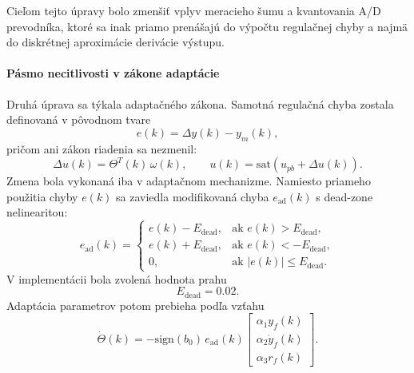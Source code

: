 Cieľom tejto úpravy bolo zmenšiť vplyv meracieho šumu a kvantovania A/D prevodníka,
ktoré sa inak priamo prenášajú do výpočtu regulačnej chyby a najmä do diskrétnej
aproximácie derivácie výstupu.

\paragraph{Pásmo necitlivosti v zákone adaptácie}

Druhá úprava sa týkala adaptačného zákona.
Samotná regulačná chyba zostala definovaná v pôvodnom tvare
\begin{equation}
    e(k) = \Delta y(k) - y_m(k),
    \label{eq:mrac_cpp_e_original}
\end{equation}
pričom ani zákon riadenia sa nezmenil:
\begin{equation}
    \Delta u(k) = \Theta^T(k)\,\omega(k),
    \qquad
    u(k) = \mathrm{sat}\!\left(u_{pb} + \Delta u(k)\right).
    \label{eq:mrac_cpp_control_unchanged}
\end{equation}
Zmena bola vykonaná iba v adaptačnom mechanizme.
Namiesto priameho použitia chyby $e(k)$ sa zaviedla modifikovaná chyba
$e_{\mathrm{ad}}(k)$ s dead-zone nelinearitou:
\begin{equation}
    e_{\mathrm{ad}}(k)=
    \begin{cases}
        e(k)-E_{\mathrm{dead}}, & \text{ak } e(k) > E_{\mathrm{dead}}, \\
        e(k)+E_{\mathrm{dead}}, & \text{ak } e(k) < -E_{\mathrm{dead}}, \\
        0, & \text{ak } |e(k)| \leq E_{\mathrm{dead}}.
    \end{cases}
    \label{eq:mrac_cpp_deadzone}
\end{equation}
V implementácii bola zvolená hodnota prahu
\begin{equation}
    E_{\mathrm{dead}} = 0.02.
    \label{eq:mrac_cpp_edead}
\end{equation}
Adaptácia parametrov potom prebieha podľa vzťahu
\begin{equation}
    \dot{\Theta}(k) =
    -\mathrm{sign}(b_0)\,e_{\mathrm{ad}}(k)
    \begin{bmatrix}
        \alpha_1 y_f(k) \\
        \alpha_2 \dot{y}_f(k) \\
        \alpha_3 r_f(k)
    \end{bmatrix}.
    \label{eq:mrac_cpp_deadzone_adaptation}
\end{equation}

